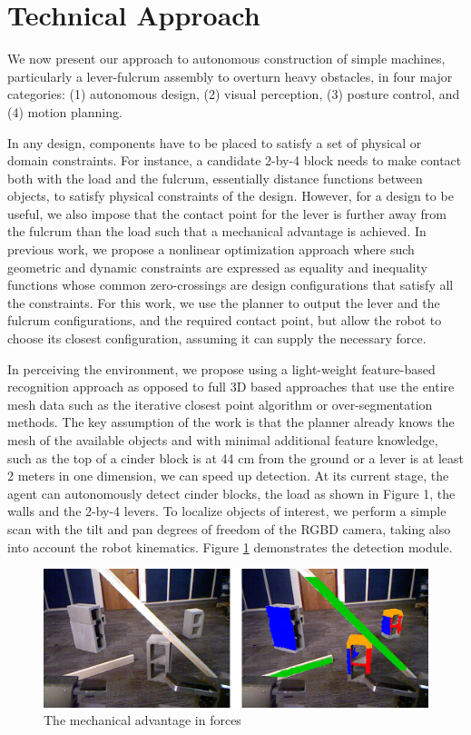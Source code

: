 \documentclass[runningheads,a4paper]{llncs}
\begin{document}
\section{Technical Approach}

We now present our approach to autonomous construction of simple machines, particularly a
lever-fulcrum assembly to overturn heavy obstacles, in four major categories: (1) autonomous design,
(2) visual perception, (3) posture control, and (4) motion planning.

In any design, components have to be placed to satisfy a set of physical or domain constraints. For
instance, a candidate 2-by-4 block needs to make contact both with the load and the fulcrum,
essentially distance functions between objects, to satisfy physical constraints of the design.
However, for a design to be useful, we also impose that the contact point for the lever is further
away from the fulcrum than the load such that a mechanical advantage is achieved. In previous work,
we propose a nonlinear optimization approach where such geometric and dynamic constraints are
expressed as equality and inequality functions whose common zero-crossings are design configurations
that satisfy all the constraints. For this work, we use the planner to output the lever and the
fulcrum configurations, and the required contact point, but allow the robot to choose its closest
configuration, assuming it can supply the necessary force.

In perceiving the environment, we propose using a light-weight feature-based recognition approach as
opposed to full 3D based approaches that use the entire mesh data such as the iterative closest
point algorithm or over-segmentation methods. The key assumption of the work is that the planner
already knows the mesh of the available objects and with minimal additional feature knowledge, such
as the top of a cinder block is at 44 cm from the ground or a lever is at least 2 meters in one
dimension, we can speed up detection. At its current stage, the agent can autonomously detect cinder
blocks, the load as shown in Figure 1, the walls and the 2-by-4 levers. To localize objects of
interest, we perform a simple scan with the tilt and pan degrees of freedom of the RGBD camera,
taking also into account the robot kinematics. Figure \ref{fig:detection} demonstrates the detection module.

\begin{figure}[ht!] 
  \centering
  \includegraphics[width=1.0\linewidth]{Figures/detection.png}
  \caption{The mechanical advantage in forces}
  \label{fig:detection}
\end{figure}
\end{document}
